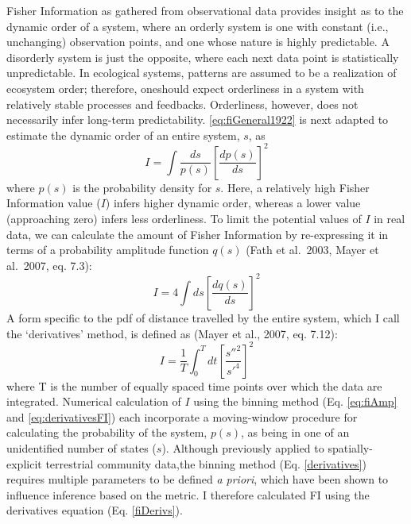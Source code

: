 \documentclass[12pt,twoside,openany]{reedthesis}
\begin{document}
Fisher Information as gathered from observational data provides insight as to the dynamic order of a system, where an orderly system is one with constant (i.e., unchanging) observation points, and one whose nature is highly predictable. A disorderly system is just the opposite, where each next data point is statistically unpredictable. In ecological systems, patterns are assumed to be a realization of ecosystem order; therefore, oneshould expect orderliness in a system with relatively stable processes and feedbacks. Orderliness, however, does not necessarily infer long-term predictability. \eqref{eq:fiGeneral1922} is next adapted to estimate the dynamic order of an entire system, \(s\), as
\begin{equation} 
  I = \int \frac{ds}{p(s)}\left[\frac{dp(s)}{ds}\right]^2
\end{equation}
where \(p(s)\) is the probability density for \(s\). Here, a relatively high Fisher Information value (\(I\)) infers higher dynamic order, whereas a lower value (approaching zero) infers less orderliness. To limit the potential values of \(I\) in real data, we can calculate the amount of Fisher Information by re-expressing it in terms of a probability amplitude function \(q(s)\) (Fath et al.~2003, Mayer et al.~2007, eq. 7.3):
\begin{equation}
  I = 4 \int ds\left[\frac{dq(s)}{ds}\right]^2
  \label{eq:fiAmp}
\end{equation}
A form specific to the pdf of distance travelled by the entire system, which I call the `derivatives' method, is defined as (Mayer et al., 2007, eq. 7.12):
\begin{equation}
  I = \frac{1}{T} \int_0^T dt\left[\frac{s''^2}{s'^4}\right]^2
  \label{eq:fiDerivs}
\end{equation}
where T is the number of equally spaced time points over which the data are integrated. Numerical calculation of \(I\) using the binning method (Eq. \eqref{eq:fiAmp} and \eqref{eq:derivativesFI}) each incorporate a moving-window procedure for calculating the probability of the system, \(p(s)\), as being in one of an unidentified number of states (\(s\)). Although previously applied to spatially-explicit terrestrial community data,the binning method (Eq. \ref{derivatives}) requires multiple parameters to be defined \emph{a priori}, which have been shown to influence inference based on the metric. I therefore calculated FI using the derivatives equation (Eq. \ref{fiDerivs}).
\end{document}
